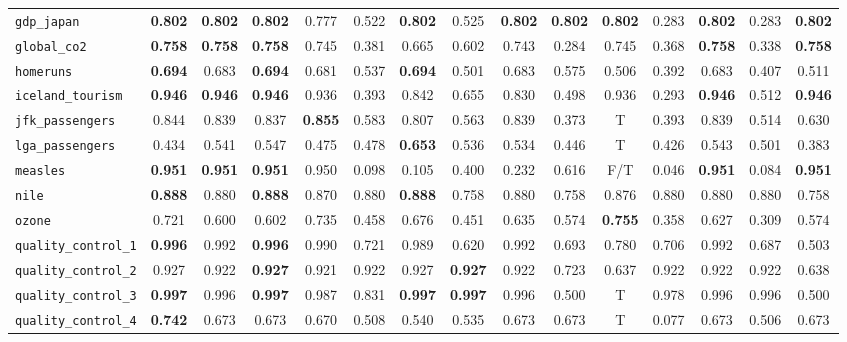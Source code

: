 \begin{tabular}{lcccccccccccccc}
\verb+gdp_japan+ & \textbf{0.802} & \textbf{0.802} & \textbf{0.802} & 0.777 & 0.522 & \textbf{0.802} & 0.525 & \textbf{0.802} & \textbf{0.802} & \textbf{0.802} & 0.283 & \textbf{0.802} & 0.283 & \textbf{0.802}\\
\verb+global_co2+ & \textbf{0.758} & \textbf{0.758} & \textbf{0.758} & 0.745 & 0.381 & 0.665 & 0.602 & 0.743 & 0.284 & 0.745 & 0.368 & \textbf{0.758} & 0.338 & \textbf{0.758}\\
\verb+homeruns+ & \textbf{0.694} & 0.683 & \textbf{0.694} & 0.681 & 0.537 & \textbf{0.694} & 0.501 & 0.683 & 0.575 & 0.506 & 0.392 & 0.683 & 0.407 & 0.511\\
\verb+iceland_tourism+ & \textbf{0.946} & \textbf{0.946} & \textbf{0.946} & 0.936 & 0.393 & 0.842 & 0.655 & 0.830 & 0.498 & 0.936 & 0.293 & \textbf{0.946} & 0.512 & \textbf{0.946}\\
\verb+jfk_passengers+ & 0.844 & 0.839 & 0.837 & \textbf{0.855} & 0.583 & 0.807 & 0.563 & 0.839 & 0.373 & T & 0.393 & 0.839 & 0.514 & 0.630\\
\verb+lga_passengers+ & 0.434 & 0.541 & 0.547 & 0.475 & 0.478 & \textbf{0.653} & 0.536 & 0.534 & 0.446 & T & 0.426 & 0.543 & 0.501 & 0.383\\
\verb+measles+ & \textbf{0.951} & \textbf{0.951} & \textbf{0.951} & 0.950 & 0.098 & 0.105 & 0.400 & 0.232 & 0.616 & F/T & 0.046 & \textbf{0.951} & 0.084 & \textbf{0.951}\\
\verb+nile+ & \textbf{0.888} & 0.880 & \textbf{0.888} & 0.870 & 0.880 & \textbf{0.888} & 0.758 & 0.880 & 0.758 & 0.876 & 0.880 & 0.880 & 0.880 & 0.758\\
\verb+ozone+ & 0.721 & 0.600 & 0.602 & 0.735 & 0.458 & 0.676 & 0.451 & 0.635 & 0.574 & \textbf{0.755} & 0.358 & 0.627 & 0.309 & 0.574\\
\verb+quality_control_1+ & \textbf{0.996} & 0.992 & \textbf{0.996} & 0.990 & 0.721 & 0.989 & 0.620 & 0.992 & 0.693 & 0.780 & 0.706 & 0.992 & 0.687 & 0.503\\
\verb+quality_control_2+ & 0.927 & 0.922 & \textbf{0.927} & 0.921 & 0.922 & 0.927 & \textbf{0.927} & 0.922 & 0.723 & 0.637 & 0.922 & 0.922 & 0.922 & 0.638\\
\verb+quality_control_3+ & \textbf{0.997} & 0.996 & \textbf{0.997} & 0.987 & 0.831 & \textbf{0.997} & \textbf{0.997} & 0.996 & 0.500 & T & 0.978 & 0.996 & 0.996 & 0.500\\
\verb+quality_control_4+ & \textbf{0.742} & 0.673 & 0.673 & 0.670 & 0.508 & 0.540 & 0.535 & 0.673 & 0.673 & T & 0.077 & 0.673 & 0.506 & 0.673\\

\end{tabular}
